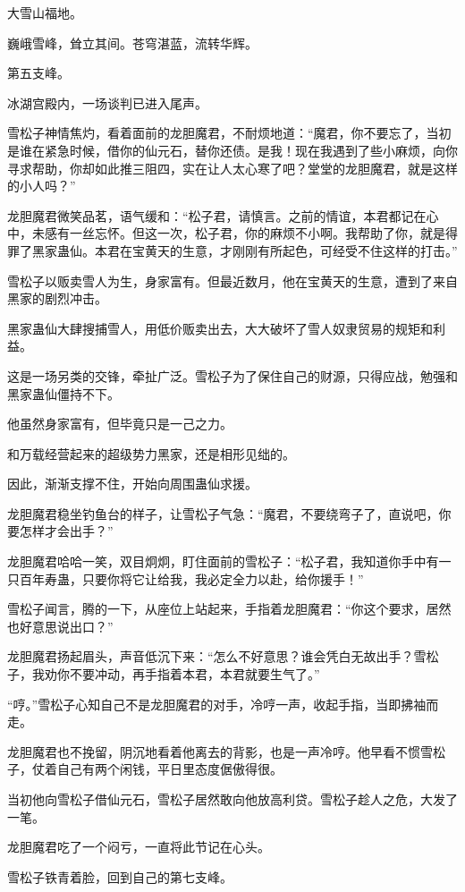 \begin{this_body}
大雪山福地。

巍峨雪峰，耸立其间。苍穹湛蓝，流转华辉。

第五支峰。

冰湖宫殿内，一场谈判已进入尾声。

雪松子神情焦灼，看着面前的龙胆魔君，不耐烦地道：“魔君，你不要忘了，当初是谁在紧急时候，借你的仙元石，替你还债。是我！现在我遇到了些小麻烦，向你寻求帮助，你却如此推三阻四，实在让人太心寒了吧？堂堂的龙胆魔君，就是这样的小人吗？”

龙胆魔君微笑品茗，语气缓和：“松子君，请慎言。之前的情谊，本君都记在心中，未感有一丝忘怀。但这一次，松子君，你的麻烦不小啊。我帮助了你，就是得罪了黑家蛊仙。本君在宝黄天的生意，才刚刚有所起色，可经受不住这样的打击。”

雪松子以贩卖雪人为生，身家富有。但最近数月，他在宝黄天的生意，遭到了来自黑家的剧烈冲击。

黑家蛊仙大肆搜捕雪人，用低价贩卖出去，大大破坏了雪人奴隶贸易的规矩和利益。

这是一场另类的交锋，牵扯广泛。雪松子为了保住自己的财源，只得应战，勉强和黑家蛊仙僵持不下。

他虽然身家富有，但毕竟只是一己之力。

和万载经营起来的超级势力黑家，还是相形见绌的。

因此，渐渐支撑不住，开始向周围蛊仙求援。

龙胆魔君稳坐钓鱼台的样子，让雪松子气急：“魔君，不要绕弯子了，直说吧，你要怎样才会出手？”

龙胆魔君哈哈一笑，双目炯炯，盯住面前的雪松子：“松子君，我知道你手中有一只百年寿蛊，只要你将它让给我，我必定全力以赴，给你援手！”

雪松子闻言，腾的一下，从座位上站起来，手指着龙胆魔君：“你这个要求，居然也好意思说出口？”

龙胆魔君扬起眉头，声音低沉下来：“怎么不好意思？谁会凭白无故出手？雪松子，我劝你不要冲动，再手指着本君，本君就要生气了。”

“哼。”雪松子心知自己不是龙胆魔君的对手，冷哼一声，收起手指，当即拂袖而走。

龙胆魔君也不挽留，阴沉地看着他离去的背影，也是一声冷哼。他早看不惯雪松子，仗着自己有两个闲钱，平日里态度倨傲得很。

当初他向雪松子借仙元石，雪松子居然敢向他放高利贷。雪松子趁人之危，大发了一笔。

龙胆魔君吃了一个闷亏，一直将此节记在心头。

雪松子铁青着脸，回到自己的第七支峰。


\end{this_body}
